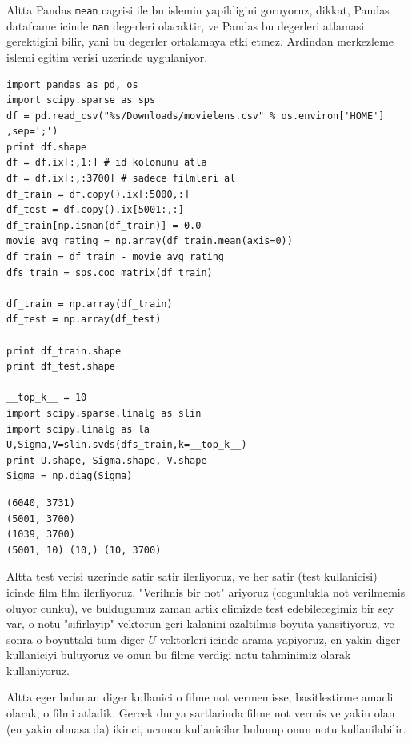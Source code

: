 \documentclass[12pt,fleqn]{article}\usepackage{../common}
\begin{document}
Altta Pandas \verb!mean! cagrisi ile bu islemin yapildigini
goruyoruz, dikkat, Pandas dataframe icinde \verb!nan! degerleri
olacaktir, ve Pandas bu degerleri atlamasi gerektigini bilir, yani bu
degerler ortalamaya etki etmez. Ardindan merkezleme islemi egitim
verisi uzerinde uygulaniyor.

\begin{verbatim}
import pandas as pd, os
import scipy.sparse as sps
df = pd.read_csv("%s/Downloads/movielens.csv" % os.environ['HOME'] ,sep=';')
print df.shape
df = df.ix[:,1:] # id kolonunu atla
df = df.ix[:,:3700] # sadece filmleri al
df_train = df.copy().ix[:5000,:]
df_test = df.copy().ix[5001:,:]
df_train[np.isnan(df_train)] = 0.0
movie_avg_rating = np.array(df_train.mean(axis=0))
df_train = df_train - movie_avg_rating
dfs_train = sps.coo_matrix(df_train)

df_train = np.array(df_train)
df_test = np.array(df_test)

print df_train.shape
print df_test.shape

__top_k__ = 10
import scipy.sparse.linalg as slin
import scipy.linalg as la
U,Sigma,V=slin.svds(dfs_train,k=__top_k__)
print U.shape, Sigma.shape, V.shape
Sigma = np.diag(Sigma)
\end{verbatim}

\begin{verbatim}
(6040, 3731)
(5001, 3700)
(1039, 3700)
(5001, 10) (10,) (10, 3700)
\end{verbatim}

Altta test verisi uzerinde satir satir ilerliyoruz, ve her satir (test
kullanicisi) icinde film film ilerliyoruz. "Verilmis bir not" ariyoruz
(cogunlukla not verilmemis oluyor cunku), ve buldugumuz zaman artik
elimizde test edebilecegimiz bir sey var, o notu "sifirlayip" vektorun
geri kalanini azaltilmis boyuta yansitiyoruz, ve sonra o boyuttaki tum
diger $U$ vektorleri icinde arama yapiyoruz, en yakin diger
kullaniciyi buluyoruz ve onun bu filme verdigi notu tahminimiz olarak
kullaniyoruz.

Altta eger bulunan diger kullanici o filme not vermemisse,
basitlestirme amacli olarak, o filmi atladik. Gercek dunya sartlarinda
filme not vermis ve yakin olan (en yakin olmasa da) ikinci, ucuncu
kullanicilar bulunup onun notu kullanilabilir.
\end{document}
